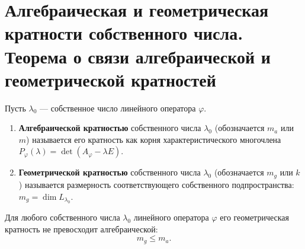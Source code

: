 \section{Алгебраическая и геометрическая кратности собственного числа. Теорема о связи алгебраической и геометрической кратностей}

\begin{definition}
Пусть $\lambda_0$ --- собственное число линейного оператора $\varphi$.
\begin{enumerate}
    \item \textbf{Алгебраической кратностью} собственного числа $\lambda_0$ (обозначается $m_a$ или $m$) называется его кратность как корня характеристического многочлена $P_\varphi(\lambda) = \det(A_\varphi - \lambda E)$.
    \item \textbf{Геометрической кратностью} собственного числа $\lambda_0$ (обозначается $m_g$ или $k$) называется размерность соответствующего собственного подпространства: $m_g = \dim L_{\lambda_0}$.
\end{enumerate}
\end{definition}

\begin{theorem}
Для любого собственного числа $\lambda_0$ линейного оператора $\varphi$ его геометрическая кратность не превосходит алгебраической:
\[
m_g \le m_a.
\]
\end{theorem}

